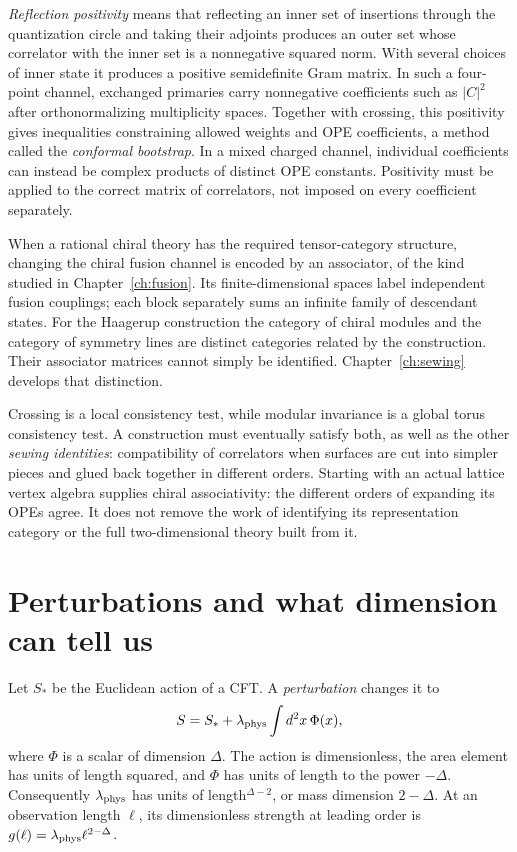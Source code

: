 \emph{Reflection positivity} means that reflecting an inner set of
insertions through the quantization circle and taking their adjoints
produces an outer set whose correlator with the inner set is a
nonnegative squared norm. With several choices of inner state it
produces a positive semidefinite Gram matrix.
In such a four-point channel, exchanged primaries
carry nonnegative coefficients such as $|C|^2$ after orthonormalizing
multiplicity spaces. Together with crossing, this positivity gives
inequalities constraining allowed weights and OPE coefficients, a
method called the \emph{conformal bootstrap}. In a mixed charged channel, individual coefficients can
instead be complex products of distinct OPE constants. Positivity
must be applied to the correct matrix of correlators, not imposed
on every coefficient separately.

When a rational chiral theory has the required tensor-category
structure, changing the chiral fusion channel is encoded by an
associator, of the kind studied in Chapter~\ref{ch:fusion}. Its
finite-dimensional spaces label independent fusion couplings; each
block separately sums an infinite family of descendant states.
For the Haagerup construction the category of chiral modules and
the category of symmetry lines are distinct categories related by
the construction. Their associator matrices cannot simply be
identified. Chapter~\ref{ch:sewing} develops that distinction.

Crossing is a local consistency test, while modular invariance is a
global torus consistency test. A construction must eventually satisfy
both, as well as the other \emph{sewing identities}: compatibility
of correlators when surfaces are cut into simpler pieces and glued
back together in different orders.
Starting with an actual lattice vertex algebra supplies chiral
associativity: the different orders of expanding its OPEs agree.
It does not remove the work of identifying its representation
category or the full two-dimensional theory built from it.

\section{Perturbations and what dimension can tell us}
\label{sec:cft-perturbations}

Let $S_*$ be the Euclidean action of a CFT. A \emph{perturbation}
changes it to
\[
 S=S_*+\lambda_{\rm phys}\int d^2x\,\Phi(x),
\]
where $\Phi$ is a scalar of dimension $\Delta$. The action is
dimensionless, the area element has units of length squared, and
$\Phi$ has units of length to the power $-\Delta$.
Consequently $\lambda_{\rm phys}$ has units of
length$^{\Delta-2}$, or mass dimension $2-\Delta$.
At an observation length $\ell$, its dimensionless strength at
leading order is $g(\ell)=\lambda_{\rm phys}\ell^{2-\Delta}$.

